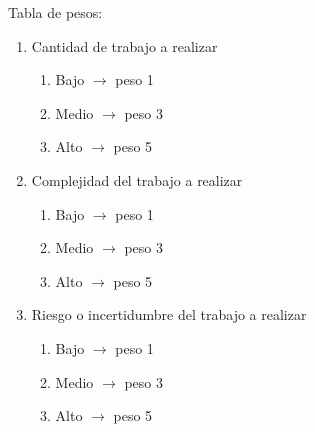 \documentclass[
11pt, %
]{charter}
\begin{document}
Tabla de pesos:
\begin{enumerate}
\item Cantidad de trabajo a realizar
	\begin{enumerate}
	\item Bajo $\rightarrow$ peso 1 
	\item Medio $\rightarrow$ peso 3
	\item Alto $\rightarrow$ peso 5
	\end{enumerate}
\item Complejidad del trabajo a realizar
	\begin{enumerate}
	\item Bajo $\rightarrow$ peso 1 
	\item Medio $\rightarrow$ peso 3
	\item Alto $\rightarrow$ peso 5
	\end{enumerate}
\item Riesgo o incertidumbre del trabajo a realizar
	\begin{enumerate}
	\item Bajo $\rightarrow$ peso 1 
	\item Medio $\rightarrow$ peso 3
	\item Alto $\rightarrow$ peso 5
	\end{enumerate}
\end{enumerate}
\end{document}
